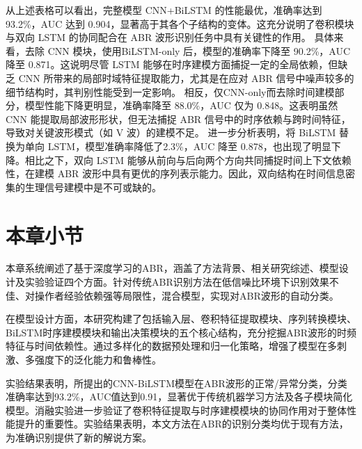从上述表格可以看出，完整模型 CNN+BiLSTM 的性能最优，准确率达到 93.2\%，AUC 达到 0.904，显著高于其各个子结构的变体。这充分说明了卷积模块与双向 LSTM 的协同配合在 ABR 波形识别任务中具有关键性的作用。
具体来看，去除 CNN 模块，使用BiLSTM-only 后，模型的准确率下降至 90.2\%，AUC 降至 0.871。这说明尽管 LSTM 能够在时序建模方面捕捉一定的全局依赖，但缺乏 CNN 所带来的局部时域特征提取能力，尤其是在应对 ABR 信号中噪声较多的细节结构时，其判别性能受到一定影响。
相反，仅CNN-only而去除时间建模部分，模型性能下降更明显，准确率降至 88.0\%，AUC 仅为 0.848。这表明虽然 CNN 能提取局部波形形状，但无法捕捉 ABR 信号中的时序依赖与跨时间特征，导致对关键波形模式（如 V 波）的建模不足。
进一步分析表明，将 BiLSTM 替换为单向 LSTM，模型准确率降低了2.3\%，AUC 降至 0.878，也出现了明显下降。相比之下，双向 LSTM 能够从前向与后向两个方向共同捕捉时间上下文依赖性，在建模 ABR 波形中具有更优的序列表示能力。因此，双向结构在时间信息密集的生理信号建模中是不可或缺的。

\section{本章小节}
本章系统阐述了基于深度学习的ABR，涵盖了方法背景、相关研究综述、模型设计及实验验证四个方面。针对传统ABR识别方法在低信噪比环境下识别效果不佳、对操作者经验依赖强等局限性，混合模型，实现对ABR波形的自动分类。

在模型设计方面，本研究构建了包括输入层、卷积特征提取模块、序列转换模块、BiLSTM时序建模模块和输出决策模块的五个核心结构，充分挖掘ABR波形的时频特征与时间依赖性。通过多样化的数据预处理和归一化策略，增强了模型在多刺激、多强度下的泛化能力和鲁棒性。

实验结果表明，所提出的CNN-BiLSTM模型在ABR波形的正常/异常分类，分类准确率达到93.2\%，AUC值达到0.91，显著优于传统机器学习方法及各子模块简化模型。消融实验进一步验证了卷积特征提取与时序建模模块的协同作用对于整体性能提升的重要性。实验结果表明，本文方法在ABR的识别分类均优于现有方法，为准确识别提供了新的解说方案。